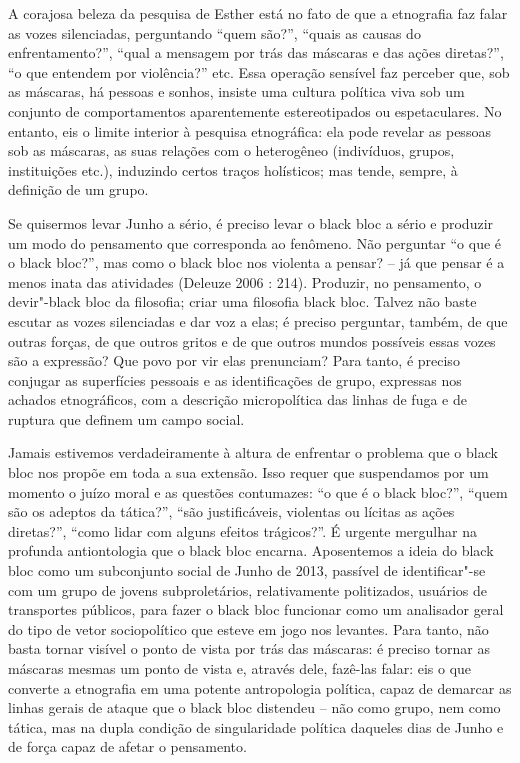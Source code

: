 A corajosa beleza da pesquisa de Esther está no fato de que a etnografia
faz falar as vozes silenciadas, perguntando ``quem são?'', ``quais as
causas do enfrentamento?'', ``qual a mensagem por trás das máscaras e
das ações diretas?'', ``o que entendem por violência?'' etc. Essa
operação sensível faz perceber que, sob as máscaras, há pessoas e
sonhos, insiste uma cultura política viva sob um conjunto de
comportamentos aparentemente estereotipados ou espetaculares. No
entanto, eis o limite interior à pesquisa etnográfica: ela pode revelar
as pessoas sob as máscaras, as suas relações com o heterogêneo
(indivíduos, grupos, instituições etc.), induzindo certos traços
holísticos; mas tende, sempre, à definição de um grupo.

Se quisermos levar Junho a sério, é preciso levar o black bloc a sério e
produzir um modo do pensamento que corresponda ao fenômeno. Não
perguntar ``o que é o black bloc?'', mas como o black bloc nos violenta
a pensar? -- já que pensar é a menos inata das atividades (Deleuze 2006
: 214). Produzir, no pensamento, o devir"-black bloc da filosofia; criar
uma filosofia black bloc. Talvez não baste escutar as vozes silenciadas
e dar voz a elas; é preciso perguntar, também, de que outras forças, de
que outros gritos e de que outros mundos possíveis essas vozes são a
expressão? Que povo por vir elas prenunciam? Para tanto, é preciso
conjugar as superfícies pessoais e as identificações de grupo, expressas
nos achados etnográficos, com a descrição micropolítica das linhas de
fuga e de ruptura que definem um campo social.

Jamais estivemos verdadeiramente à altura de enfrentar o problema que o
black bloc nos propõe em toda a sua extensão. Isso requer que
suspendamos por um momento o juízo moral e as questões contumazes: ``o
que é o black bloc?'', ``quem são os adeptos da tática?'', ``são
justificáveis, violentas ou lícitas as ações diretas?'', ``como lidar
com alguns efeitos trágicos?''. É urgente mergulhar na profunda
antiontologia que o black bloc encarna. Aposentemos a ideia do black
bloc como um subconjunto social de Junho de 2013, passível de
identificar"-se com um grupo de jovens subproletários, relativamente
politizados, usuários de transportes públicos, para fazer o black bloc
funcionar como um analisador geral do tipo de vetor sociopolítico que
esteve em jogo nos levantes. Para tanto, não basta tornar visível o
ponto de vista por trás das máscaras: é preciso tornar as máscaras
mesmas um ponto de vista e, através dele, fazê-las falar: eis o que
converte a etnografia em uma potente antropologia política, capaz de
demarcar as linhas gerais de ataque que o black bloc distendeu -- não
como grupo, nem como tática, mas na dupla condição de singularidade
política daqueles dias de Junho e de força capaz de afetar o pensamento.

